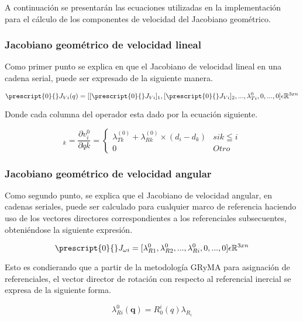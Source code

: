         A continuación se presentarán las ecuaciones utilizadas en la implementación para el 
        cálculo de los componentes de velocidad del Jacobiano geométrico.

    \subsubsection{Jacobiano geométrico de velocidad lineal}
        Como primer punto se explica en \cite{3DMotion} que el Jacobiano de velocidad lineal 
        en una cadena serial, puede ser expresado de la siguiente manera.

        \begin{equation}
            \prescript{0}{}J_{Vi}(q) = 
            [[\prescript{0}{}J_{Vi}]_1, [\prescript{0}{}J_{Vi}]_2, ..., \lambda^{0}_{Ti}, 0, ..., 0]
            \epsilon \mathbb{R}^{3xn}
            \label{eq:Jv}
        \end{equation}

        Donde cada columna del operador esta dado por la ecuación siguiente.

        \begin{equation*}
            [\prescript{0}{}J_{Vi}]_k = \frac{\partial v^{0}_i}{\partial \dot{q}k} = 
            \begin{cases}
                \lambda^{(0)}_{Tk} + \lambda^{(0)}_{Rk} \times (d_i - d_k) & si k \leqq i \\
                0                                                          & Otro
            \end{cases}
        \end{equation*}

    \subsubsection{Jacobiano geométrico de velocidad angular}
        Como segundo punto, se explica que el Jacobiano de velocidad angular, 
        en cadenas seriales, puede ser calculado para cualquier marco de referencia 
        haciendo uso de los vectores directores correspondientes a los referenciales 
        subsecuentes, obteniéndose la siguiente expresión.

        \begin{equation}
            \prescript{0}{}J_{\omega i} =
            [\lambda^{0}_{R1}, \lambda^{0}_{R2}, ..., \lambda^{0}_{Ri}, 0, ..., 0]
            \epsilon \mathbb{R}^{3xn}
            \label{eq:Jw}
        \end{equation}

        Esto es condierando que a partir de la metodología GRyMA para asignación de referenciales, 
        el vector director de rotación con respecto al referencial inercial se expresa de la siguiente 
        forma.

        \begin{equation*}
            \lambda^{0}_{Ri}(\textbf{q}) = R^i_0(q)\lambda_{R_i}
        \end{equation*}